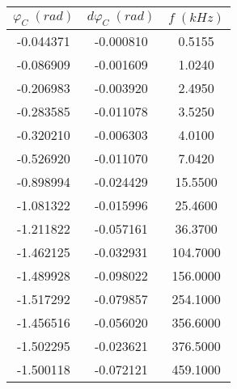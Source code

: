 \begin{tabular}{cc|c}
\toprule
$\varphi_{C} \; (rad)$ & $d\varphi_{C} \; (rad)$ & $f \; (kHz)$ \\
\midrule
             -0.044371 &               -0.000810 &       0.5155 \\
             -0.086909 &               -0.001609 &       1.0240 \\
             -0.206983 &               -0.003920 &       2.4950 \\
             -0.283585 &               -0.011078 &       3.5250 \\
             -0.320210 &               -0.006303 &       4.0100 \\
             -0.526920 &               -0.011070 &       7.0420 \\
             -0.898994 &               -0.024429 &      15.5500 \\
             -1.081322 &               -0.015996 &      25.4600 \\
             -1.211822 &               -0.057161 &      36.3700 \\
             -1.462125 &               -0.032931 &     104.7000 \\
             -1.489928 &               -0.098022 &     156.0000 \\
             -1.517292 &               -0.079857 &     254.1000 \\
             -1.456516 &               -0.056020 &     356.6000 \\
             -1.502295 &               -0.023621 &     376.5000 \\
             -1.500118 &               -0.072121 &     459.1000 \\
\bottomrule
\end{tabular}

